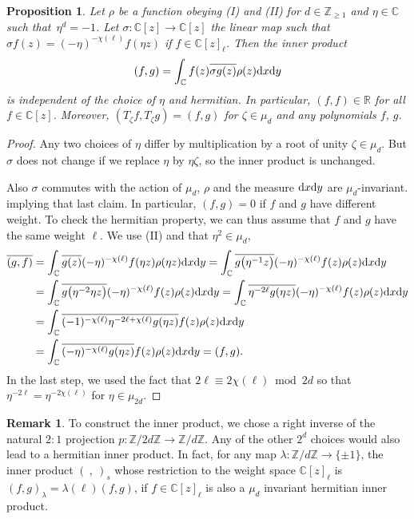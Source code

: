 \documentclass[10pt,a4paper]{amsart}
\numberwithin{equation}{section}
\newtheorem{Proposition}[Theorem]{Proposition}
\theoremstyle{definition}
\newtheorem{Remark}[Theorem]{Remark}
\begin{document}
\begin{Proposition}
 Let $\rho$ be a function obeying {\rm (I)} and {\rm (II)} for $d\in\mathbb Z_{\geq1}$ and $\eta\in\mathbb C$ such that~${\eta^d=-1}$.
 Let $\sigma\colon \mathbb C[z]\to\mathbb C[z]$ the linear map such that $\sigma f(z)=(-\eta)^{-\chi(\ell)} f(\eta z)$ if $f\in\mathbb C[z]_\ell$. Then the inner product
 \[
 (f,g)=\int_{\mathbb C}f(z)\overline{\sigma g(z)}\rho(z){\rm d}x{\rm d}y
 \]
 is independent of the choice of $\eta$ and hermitian. In particular, $(f,f)\in\mathbb R$ for all $f\in\mathbb C[z]$.
 Moreover, $(T_\zeta f,T_\zeta g)=(f,g)$ for $\zeta\in\mu_d$ and any polynomials $f$, $g$.
\end{Proposition}
\begin{proof}
 Any two choices of $\eta$ differ by multiplication by a root of unity $\zeta\in\mu_d$. But $\sigma$ does not change if we replace $\eta$ by $\eta\zeta$, so the inner product is unchanged.

 Also $\sigma$ commutes with the action of $\mu_d$, $\rho$ and the measure ${\rm d}x{\rm d}y$ are $\mu_d$-invariant. implying that last claim. In particular, $(f,g)=0$ if $f$ and $g$ have different weight.
 To check the hermitian property, we can thus assume that $f$ and $g$ have the same weight $\ell$.
 We use (II) and that $\eta^2\in\mu_d$,
 \begin{align*}
 \overline{(g,f)}&=\int_{\mathbb C}\overline{g(z)}(-\eta)^{-\chi(\ell)}f(\eta z)\rho(\eta z){\rm d}x{\rm d}y
 =\int_{\mathbb C}\overline{g\big(\eta^{-1} z\big)}(-\eta)^{-\chi(\ell)}f(z)\rho(z){\rm d}x{\rm d}y
 \\
 &=\int_{\mathbb C}\overline{g\big(\eta^{-2}\eta z\big)}(-\eta)^{-\chi(\ell)}f(z)\rho(z){\rm d}x{\rm d}y
 =\int_{\mathbb C}\overline{\eta^{-2\ell}g(\eta z)}(-\eta)^{-\chi(\ell)}f(z)\rho(z){\rm d}x{\rm d}y
 \\
 &=\int_{\mathbb C}\overline{(-1)^{-\chi(\ell)}\eta^{-2\ell+\chi(\ell)}g(\eta z)}f(z)\rho(z){\rm d}x{\rm d}y
 \\
 &=\int_{\mathbb C}\overline{(-\eta)^{-\chi(\ell)}g(\eta z)}f(z)\rho(z){\rm d}x{\rm d}y=(f,g).
 \end{align*}
 In the last step, we used the fact that $2\ell\equiv 2\chi(\ell)\bmod 2d$ so that $\eta^{-2\ell}=\eta^{-2\chi(\ell)}$
 for $\eta\in\mu_{2d}$.
\end{proof}

\begin{Remark}
 To construct the inner product, we chose a right inverse of the natural $2:1$ projection $p\colon \mathbb Z/2d\mathbb Z\to \mathbb Z/d\mathbb Z$. Any of the other $2^d$ choices would also lead to a hermitian inner product. In fact, for any map $\lambda\colon\mathbb Z/d\mathbb Z\to\{\pm1\}$, the inner product $(\ ,\ )_s$ whose restriction to the weight space $\mathbb C[z]_\ell$ is
 $
 (f,g)_\lambda=\lambda(\ell)(f,g)$, if $f\in \mathbb C[z]_\ell$
 is also a $\mu_d$ invariant hermitian inner product.
\end{Remark}
\end{document}
